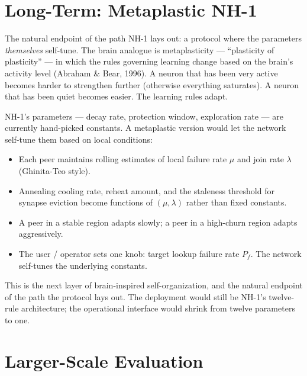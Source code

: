 \documentclass[twoside,nobib]{tufte-book}
\begin{document}
\section{Long-Term: Metaplastic NH-1}

The natural endpoint of the path NH-1 lays out: a protocol where
the parameters \emph{themselves} self-tune. The brain analogue
is metaplasticity --- ``plasticity of plasticity'' --- in which
the rules governing learning change based on the brain's
activity level (Abraham \& Bear, 1996). A neuron that has been
very active becomes harder to strengthen further (otherwise
everything saturates). A neuron that has been quiet becomes
easier. The learning rules adapt.

NH-1's parameters --- decay rate, protection window,
exploration rate --- are currently hand-picked constants. A
metaplastic version would let the network self-tune them based
on local conditions:

\begin{itemize}\setlength\itemsep{0.1em}
  \item Each peer maintains rolling estimates of local failure
    rate $\mu$ and join rate $\lambda$ (Ghinita-Teo style).
  \item Annealing cooling rate, reheat amount, and the
    staleness threshold for synapse eviction become functions
    of $(\mu, \lambda)$ rather than fixed constants.
  \item A peer in a stable region adapts slowly; a peer in a
    high-churn region adapts aggressively.
  \item The user / operator sets one knob: target lookup
    failure rate $P_f$. The network self-tunes the underlying
    constants.
\end{itemize}

This is the next layer of brain-inspired self-organization, and
the natural endpoint of the path the protocol lays out. The
deployment would still be NH-1's twelve-rule architecture; the
operational interface would shrink from twelve parameters to one.

\section{Larger-Scale Evaluation}
\end{document}
